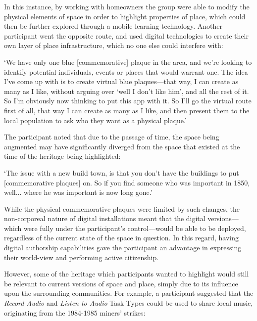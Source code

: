 In this instance, by working with homeowners the group were able to modify the physical elements of space in order to highlight properties of place, which could then be further explored through a mobile learning technology. Another participant went the opposite route, and used digital technologies to create their own layer of place infrastructure, which no one else could interfere with:

\begin{displayquote}
`We have only one blue [commemorative] plaque in the area, and we're looking to identify potential individuals, events or places that would warrant one. The idea I've come up with is to create virtual blue plaques---that way, I can create as many as I like, without arguing over `well I don't like him', and all the rest of it. So I'm obviously now thinking to put this app with it. So I'll go the virtual route first of all, that way I can create as many as I like, and then present them to the local population to ask who they want as a physical plaque.'
\end{displayquote}

The participant noted that due to the passage of time, the space being augmented may have significantly diverged from the space that existed at the time of the heritage being highlighted:

\begin{displayquote}
`The issue with a new build town, is that you don't have the buildings to put [commemorative plaques] on. So if you find someone who was important in 1850, well... where he was important is now long gone.'
\end{displayquote}

While the physical commemorative plaques were limited by such changes, the non-corporeal nature of digital installations meant that the digital versions---which were fully under the participant's control---would be able to be deployed, regardless of the current state of the space in question. In this regard, having digital authorship capabilities gave the participant an advantage in expressing their world-view and performing active citizenship.

However, some of the heritage which participants wanted to highlight would still be relevant to current versions of space and place, simply due to its influence upon the surrounding communities. For example, a participant suggested that the \textit{Record Audio} and \textit{Listen to Audio} Task Types could be used to share local music, originating from the 1984-1985 miners' strikes:

